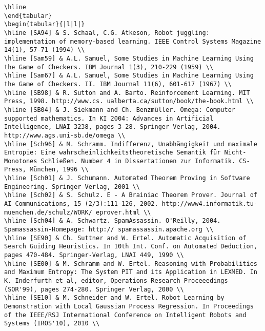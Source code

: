\documentclass[10pt]{article}
\begin{document}
\begin{verbatim}
\hline
\end{tabular}
\begin{tabular}{|l|l|}
\hline [SA94] & S. Schaal, C.G. Atkeson, Robot juggling: implementation of memory-based learning. IEEE Control Systems Magazine 14(1), 57-71 (1994) \\
\hline [Sam59] & A.L. Samuel, Some Studies in Machine Learning Using the Game of Checkers. IBM Journal 1(3), 210-229 (1959) \\
\hline [Sam67] & A.L. Samuel, Some Studies in Machine Learning Using the Game of Checkers. II. IBM Journal 11(6), 601-617 (1967) \\
\hline [SB98] & R. Sutton and A. Barto. Reinforcement Learning. MIT Press, 1998. http://www.cs. ualberta.ca/sutton/book/the-book.html \\
\hline [SB04] & J. Siekmann and Ch. Benzmüller. Omega: Computer supported mathematics. In KI 2004: Advances in Artificial Intelligence, LNAI 3238, pages 3-28. Springer Verlag, 2004. http://www.ags.uni-sb.de/omega \\
\hline [Sch96] & M. Schramm. Indifferenz, Unabhängigkeit und maximale Entropie: Eine wahrscheinlichkeitstheoretische Semantik für Nicht-Monotones Schließen. Number 4 in Dissertationen zur Informatik. CS-Press, München, 1996 \\
\hline [Sch01] & J. Schumann. Automated Theorem Proving in Software Engineering. Springer Verlag, 2001 \\
\hline [Sch02] & S. Schulz. E - A Brainiac Theorem Prover. Journal of AI Communications, 15 (2/3):111-126, 2002. http://www4.informatik.tu-muenchen.de/schulz/WORK/ eprover.html \\
\hline [Sch04] & A. Schwartz. SpamAssassin. O'Reilly, 2004. Spamassassin-Homepage: http:// spamassassin.apache.org \\
\hline [SE90] & Ch. Suttner and W. Ertel. Automatic Acquisition of Search Guiding Heuristics. In 10th Int. Conf. on Automated Deduction, pages 470-484. Springer-Verlag, LNAI 449, 1990 \\
\hline [SE00] & M. Schramm and W. Ertel. Reasoning with Probabilities and Maximum Entropy: The System PIT and its Application in LEXMED. In K. Inderfurth et al, editor, Operations Research Proceeedings (SOR'99), pages 274-280. Springer Verlag, 2000 \\
\hline [SE10] & M. Schneider and W. Ertel. Robot Learning by Demonstration with Local Gaussian Process Regression. In Proceedings of the IEEE/RSJ International Conference on Intelligent Robots and Systems (IROS'10), 2010 \\

\end{verbatim}
\end{document}
